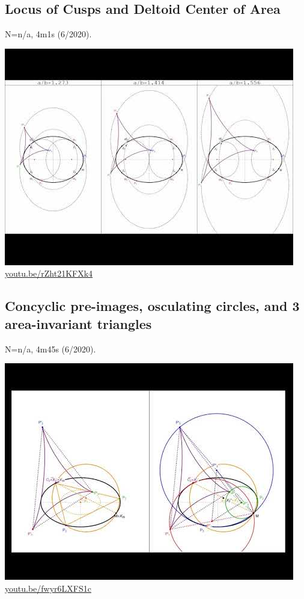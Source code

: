 \documentclass[12pt]{amsart}
\begin{document}
\subsection{Locus of Cusps and Deltoid Center of Area}
\label{vid:rZht21KFXk4}
\noindent N=n/a, 4m1s (6/2020). 
\begin{center}\includegraphics[width=.5\textwidth]{pics/rZht21KFXk4.jpg} \\ 
\href{https://youtu.be/rZht21KFXk4}{\url{youtu.be/rZht21KFXk4}}\end{center}
% 

\subsection{Concyclic pre-images, osculating circles, and 3 area-invariant triangles}
\label{vid:fwyr6LXFS1c}
\noindent N=n/a, 4m45s (6/2020). 
\begin{center}\includegraphics[width=.5\textwidth]{pics/fwyr6LXFS1c.jpg} \\ 
\href{https://youtu.be/fwyr6LXFS1c}{\url{youtu.be/fwyr6LXFS1c}}\end{center}
% 
\end{document}
